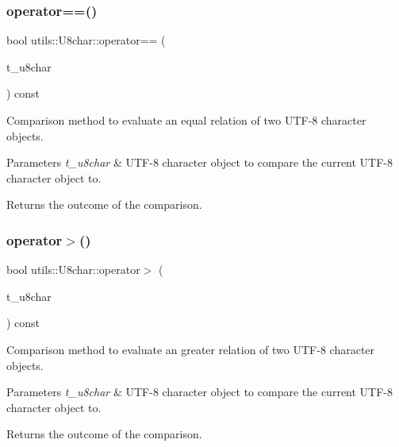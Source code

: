 \subsubsection{\texorpdfstring{operator==()}{operator==()}}
{\footnotesize\ttfamily bool utils\+::\+U8char\+::operator== (\begin{DoxyParamCaption}\item[{\hyperlink{classutils_1_1U8char}{U8char} const \&}]{t\+\_\+u8char }\end{DoxyParamCaption}) const}

Comparison method to evaluate an \textquotesingle{}equal\textquotesingle{} relation of two U\+T\+F-\/8 character objects. 
\begin{DoxyParams}{Parameters}
{\em t\+\_\+u8char} & U\+T\+F-\/8 character object to compare the current U\+T\+F-\/8 character object to. \\
\hline
\end{DoxyParams}
\begin{DoxyReturn}{Returns}
the outcome of the comparison. 
\end{DoxyReturn}
\mbox{\label{classutils_1_1U8char_a768633a36d10be09756cd66c6346b609}} 
\subsubsection{\texorpdfstring{operator$>$()}{operator>()}}
{\footnotesize\ttfamily bool utils\+::\+U8char\+::operator$>$ (\begin{DoxyParamCaption}\item[{\hyperlink{classutils_1_1U8char}{U8char} const \&}]{t\+\_\+u8char }\end{DoxyParamCaption}) const}

Comparison method to evaluate an \textquotesingle{}greater\textquotesingle{} relation of two U\+T\+F-\/8 character objects. 
\begin{DoxyParams}{Parameters}
{\em t\+\_\+u8char} & U\+T\+F-\/8 character object to compare the current U\+T\+F-\/8 character object to. \\
\hline
\end{DoxyParams}
\begin{DoxyReturn}{Returns}
the outcome of the comparison. 
\end{DoxyReturn}
\mbox{\label{classutils_1_1U8char_a5b7e27b12e6ff45253996414d4fc77fa}} 
